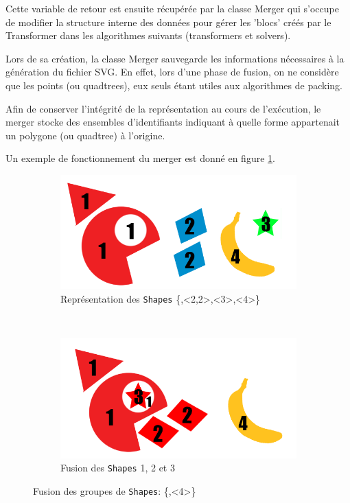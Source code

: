 Cette variable de retour est ensuite récupérée par la classe Merger qui s'occupe de modifier la structure interne des données pour gérer les 'blocs' créés par le Transformer dans les algorithmes suivants (transformers et solvers). 

Lors de sa création, la classe Merger sauvegarde les informations nécessaires à la génération du fichier SVG. En effet, lors d'une phase de fusion, on ne considère que les points (ou quadtrees), eux seuls étant utiles aux algorithmes de packing. 

Afin de conserver l'intégrité de la représentation au cours de l'exécution, le merger stocke des ensembles d'identifiants indiquant à quelle forme appartenait un polygone (ou quadtree) à l'origine.

Un exemple de fonctionnement du merger est donné en figure \ref{fig:schemamerger}.

\begin{figure}[!htb]
    \centering
    \begin{subfigure}{.7\linewidth}
        \centering
        \includegraphics[width=\linewidth]{img/schemamergerA.png}
        \caption{Représentation des \texttt{Shapes} \{<1,1,1>,<2,2>,<3>,<4>\}}
    \end{subfigure}%
    ~ \\
    \begin{subfigure}{.7\linewidth}
        \centering
        \includegraphics[width=\linewidth]{img/schemamergerB.png}
        \caption{Fusion des \texttt{Shapes} 1, 2 et 3}
    \end{subfigure}
    
    \caption{Fusion des groupes de \texttt{Shapes}: \{<1,1,1,2,3,3>,<4>\}}
    \label{fig:schemamerger}
\end{figure}



